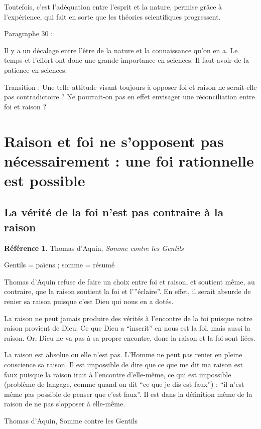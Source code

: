 \documentclass[french]{book}
\theoremstyle{definition}
\newtheorem*{refe}{Référence}
\begin{document}
Toutefois, c’est l’adéquation entre l’esprit et la nature, permise grâce à l'expérience, qui fait en sorte que les théories scientifiques progressent.

Paragraphe 30 :

Il y a un décalage entre l’être de la nature et la connaissance qu’on en a. Le temps et l’effort ont donc une grande importance en sciences. Il faut avoir de la patience en sciences.

Transition : Une telle attitude visant toujours à opposer foi et raison ne serait-elle pas contradictoire ? Ne pourrait-on pas en effet envisager une réconciliation entre foi et raison ?

\section{Raison et foi ne s'opposent pas nécessairement : une foi rationnelle est possible}

\subsection{La vérité de la foi n'est pas contraire à la raison}

\begin{refe}
	Thomas d'Aquin, \textit{Somme contre les Gentils}
\end{refe}

Gentils = païens ; somme = résumé

Thomas d’Aquin refuse de faire un choix entre foi et raison, et soutient même, au contraire, que la raison soutient la foi et l’”éclaire”. En effet, il serait absurde de renier sa raison puisque c’est Dieu qui nous en a dotés.

La raison ne peut jamais produire des vérités à l’encontre de la foi puisque notre raison provient de Dieu. Ce que Dieu a “inscrit” en nous est la foi, mais aussi la raison. Or, Dieu ne va pas à sa propre encontre, donc la raison et la foi sont liées.

La raison est absolue ou elle n’est pas. L’Homme ne peut pas renier en pleine conscience sa raison. Il est impossible de dire que ce que me dit ma raison est faux puisque la raison irait à l’encontre d’elle-même, ce qui est impossible (problème de langage, comme quand on dit “ce que je dis est faux”) : “il n’est même pas possible de penser que c’est faux”. Il est dans la définition même de la raison de ne pas s’opposer à elle-même.

Thomas d'Aquin, Somme contre les Gentils
\end{document}
